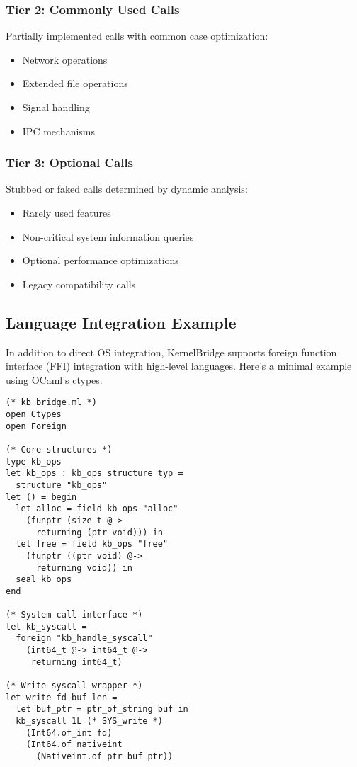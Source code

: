 \documentclass[conference]{IEEEtran}
\begin{document}
\subsubsection{Tier 2: Commonly Used Calls}
Partially implemented calls with common case optimization:
\begin{itemize}
	\item Network operations
	\item Extended file operations
	\item Signal handling
	\item IPC mechanisms
\end{itemize}

\subsubsection{Tier 3: Optional Calls}
Stubbed or faked calls determined by dynamic analysis:
\begin{itemize}
	\item Rarely used features
	\item Non-critical system information queries
	\item Optional performance optimizations
	\item Legacy compatibility calls
\end{itemize}


\subsection{Language Integration Example}

In addition to direct OS integration, KernelBridge
supports foreign function interface (FFI)
integration with high-level languages. Here's a
minimal example using OCaml's ctypes:

\begin{verbatim}
(* kb_bridge.ml *)
open Ctypes
open Foreign

(* Core structures *)
type kb_ops
let kb_ops : kb_ops structure typ = 
  structure "kb_ops"
let () = begin
  let alloc = field kb_ops "alloc" 
    (funptr (size_t @-> 
      returning (ptr void))) in
  let free = field kb_ops "free" 
    (funptr ((ptr void) @-> 
      returning void)) in
  seal kb_ops
end

(* System call interface *)
let kb_syscall = 
  foreign "kb_handle_syscall"
    (int64_t @-> int64_t @-> 
     returning int64_t)

(* Write syscall wrapper *)
let write fd buf len =
  let buf_ptr = ptr_of_string buf in
  kb_syscall 1L (* SYS_write *)
    (Int64.of_int fd)
    (Int64.of_nativeint 
      (Nativeint.of_ptr buf_ptr))
\end{verbatim}
\end{document}
